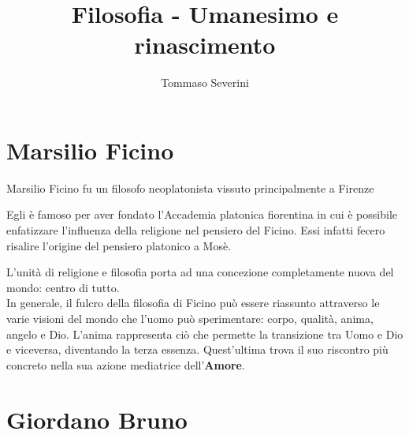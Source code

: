 \documentclass[10pt,a4paper]{article}
\author{Tommaso Severini}
\title{Filosofia - Umanesimo e rinascimento}
\begin{document}
	\maketitle
	
	\section*{Marsilio Ficino}
	
	Marsilio Ficino fu un filosofo neoplatonista vissuto principalmente a Firenze
	
	Egli è famoso per aver fondato l'Accademia platonica fiorentina in cui è possibile enfatizzare l'influenza della religione nel pensiero del Ficino. Essi infatti fecero risalire l'origine del pensiero platonico a Mosè.
	
	L'unità di religione e filosofia porta ad una concezione completamente nuova del mondo: centro di tutto.\\
	
	In generale, il fulcro della filosofia di Ficino può essere riassunto attraverso le varie visioni del mondo che l'uomo può sperimentare: corpo, qualità, anima, angelo e Dio. L'anima rappresenta ciò che permette la transizione tra Uomo e Dio e viceversa, diventando la terza essenza. Quest'ultima trova il suo riscontro più concreto nella sua azione mediatrice dell'\textbf{Amore}.
	
	\section*{Giordano Bruno}
	
	
	
\end{document}
